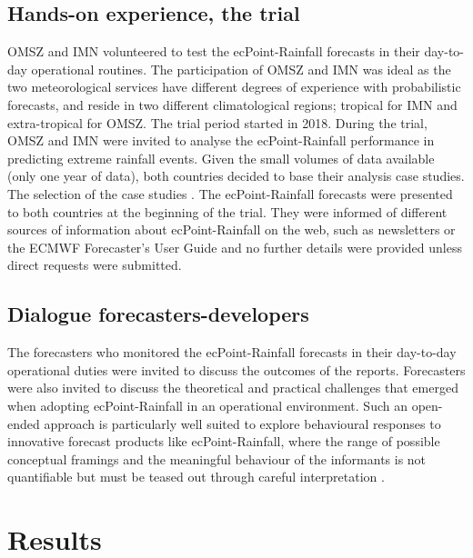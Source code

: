 \documentclass[twocol]{ametsocV5} %
\begin{document}
\subsection{Hands-on experience, the trial}
 OMSZ and IMN volunteered to test the ecPoint-Rainfall forecasts in their day-to-day operational routines. The participation of OMSZ and IMN was ideal as the two meteorological services have different degrees of experience with probabilistic forecasts, and reside in two different climatological regions; tropical for IMN and extra-tropical for OMSZ. The trial period started in 2018. During the trial, OMSZ and IMN were invited to analyse the ecPoint-Rainfall performance in predicting extreme rainfall events. Given the small volumes of data available (only one year of data), both countries decided to base their analysis case studies. The selection of the case studies . The ecPoint-Rainfall forecasts were presented to both countries at the beginning of the trial. They were informed of different sources of information about ecPoint-Rainfall on the web, such as newsletters or the ECMWF Forecaster's User Guide \citep{Owens2018} and no further details were provided unless direct requests were submitted.
	
\subsection{Dialogue forecasters-developers}
The forecasters who monitored the ecPoint-Rainfall forecasts in their day-to-day operational duties were invited to discuss the outcomes of the reports. Forecasters were also invited to discuss the theoretical and practical challenges that emerged when adopting ecPoint-Rainfall in an operational environment. Such an open-ended approach is particularly well suited to explore behavioural responses to innovative forecast products like ecPoint-Rainfall, where the range of possible conceptual framings and the meaningful behaviour of the informants is not quantifiable but must be teased out through careful interpretation \citep{Patton2002}.	


\section{Results}
\end{document}
